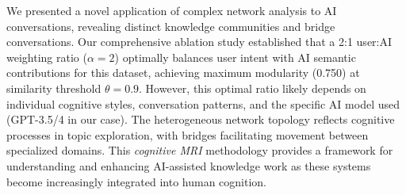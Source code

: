 \documentclass{svproc}
\begin{document}
We presented a novel application of complex network analysis to AI conversations, revealing distinct knowledge communities and bridge conversations. Our comprehensive ablation study established that a 2:1 user:AI weighting ratio ($\alpha = 2$) optimally balances user intent with AI semantic contributions for this dataset, achieving maximum modularity (0.750) at similarity threshold $\theta = 0.9$. However, this optimal ratio likely depends on individual cognitive styles, conversation patterns, and the specific AI model used (GPT-3.5/4 in our case). The heterogeneous network topology reflects cognitive processes in topic exploration, with bridges facilitating movement between specialized domains. This \emph{cognitive MRI} methodology provides a framework for understanding and enhancing AI-assisted knowledge work as these systems become increasingly integrated into human cognition.
\end{document}
